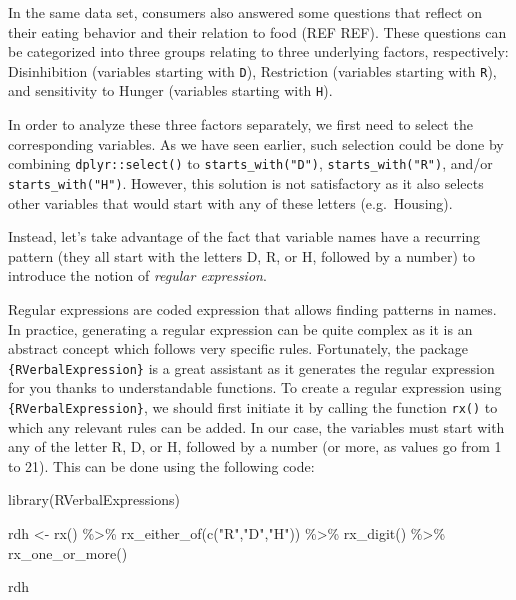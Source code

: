 \documentclass[
]{book}
\newenvironment{Shaded}{\begin{snugshade}}{\end{snugshade}}
\newcommand{\FunctionTok}[1]{\textcolor[rgb]{0.00,0.00,0.00}{#1}}
\newcommand{\NormalTok}[1]{#1}
\newcommand{\OtherTok}[1]{\textcolor[rgb]{0.56,0.35,0.01}{#1}}
\newcommand{\SpecialCharTok}[1]{\textcolor[rgb]{0.00,0.00,0.00}{#1}}
\newcommand{\StringTok}[1]{\textcolor[rgb]{0.31,0.60,0.02}{#1}}
\begin{document}
In the same data set, consumers also answered some questions that reflect on their eating behavior and their relation to food (REF REF). These questions can be categorized into three groups relating to three underlying factors, respectively: Disinhibition (variables starting with \texttt{D}), Restriction (variables starting with \texttt{R}), and sensitivity to Hunger (variables starting with \texttt{H}).

In order to analyze these three factors separately, we first need to select the corresponding variables. As we have seen earlier, such selection could be done by combining \texttt{dplyr::select()} to \texttt{starts\_with("D")}, \texttt{starts\_with("R")}, and/or \texttt{starts\_with("H")}. However, this solution is not satisfactory as it also selects other variables that would start with any of these letters (e.g.~Housing).

Instead, let's take advantage of the fact that variable names have a recurring pattern (they all start with the letters D, R, or H, followed by a number) to introduce the notion of \emph{regular expression}.

Regular expressions are coded expression that allows finding patterns in names. In practice, generating a regular expression can be quite complex as it is an abstract concept which follows very specific rules. Fortunately, the package \texttt{\{RVerbalExpression\}} is a great assistant as it generates the regular expression for you thanks to understandable functions.
To create a regular expression using \texttt{\{RVerbalExpression\}}, we should first initiate it by calling the function \texttt{rx()} to which any relevant rules can be added. In our case, the variables must start with any of the letter R, D, or H, followed by a number (or more, as values go from 1 to 21). This can be done using the following code:

\begin{Shaded}
\begin{Highlighting}[]
\FunctionTok{library}\NormalTok{(RVerbalExpressions)}

\NormalTok{rdh }\OtherTok{\textless{}{-}} \FunctionTok{rx}\NormalTok{() }\SpecialCharTok{\%\textgreater{}\%} 
  \FunctionTok{rx\_either\_of}\NormalTok{(}\FunctionTok{c}\NormalTok{(}\StringTok{"R"}\NormalTok{,}\StringTok{"D"}\NormalTok{,}\StringTok{"H"}\NormalTok{)) }\SpecialCharTok{\%\textgreater{}\%} 
  \FunctionTok{rx\_digit}\NormalTok{() }\SpecialCharTok{\%\textgreater{}\%} 
  \FunctionTok{rx\_one\_or\_more}\NormalTok{()}

\NormalTok{rdh}
\end{Highlighting}
\end{Shaded}
\end{document}
